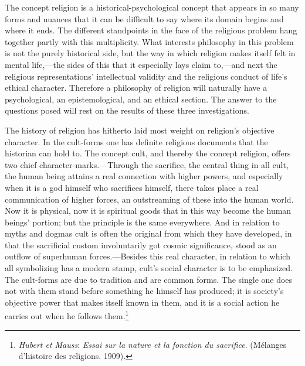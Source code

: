 \documentclass[12pt,a4paper]{book}
\newcommand{\opage}[1]{\marginnote{\footnotesize\textit{[#1]}}}
\begin{document}
The concept religion is a historical-psychological concept that \opage{371}appears in so many forms and nuances
that it can be difficult to say where its domain begins and where it ends. The different standpoints
in the face of the religious problem hang together partly with this multiplicity. What interests
philosophy in this problem is not the purely historical side, but the way in which religion makes
itself felt in mental life,---the sides of this that it especially lays claim to,---and next the
religious representations' intellectual validity and the religious conduct of life's ethical
character. Therefore a philosophy of religion will naturally have a psychological, an epistemological,
and an ethical section. The answer to the questions posed will rest on the results of these three
investigations.

The history of religion has hitherto laid most weight on religion's objective character. In the
cult-forms one has definite religious documents that the historian can hold to. The concept cult, and
thereby the concept religion, offers two chief character-marks.---Through the sacrifice, the central thing
in all cult, the human being attains a real connection with higher powers, and especially when it is a god himself who sacrifices himself, there takes place a real communication of higher forces, an
outstreaming of these into the human world. Now it is physical, now it is spiritual goods that in this
way become the human beings' portion; but the principle is the same everywhere. And in relation to
myths and dogmas cult is often the original from which they have developed, in that the sacrificial
custom involuntarily got cosmic significance, stood as an outflow of superhuman forces.---Besides this
real character, in relation to which all symbolizing has a modern stamp, cult's social character is to be
emphasized. The cult-forms are due to tradition and are common forms. The single one does not with
them stand before something he himself has produced; it is society's objective power that makes itself
known in them, and it is a social action he carries out when he follows them.\footnote{\emph{Hubert et
Mauss}: \emph{Essai sur la nature et la fonction du sacrifice}. (Mélanges d'histoire des religions.
1909).}
\end{document}
